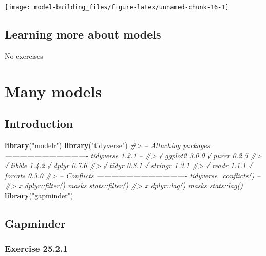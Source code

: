 \documentclass[]{book}
\newenvironment{Shaded}{\begin{snugshade}}{\end{snugshade}}
\newcommand{\CommentTok}[1]{\textcolor[rgb]{0.56,0.35,0.01}{\textit{#1}}}
\newcommand{\KeywordTok}[1]{\textcolor[rgb]{0.13,0.29,0.53}{\textbf{#1}}}
\newcommand{\NormalTok}[1]{#1}
\newcommand{\StringTok}[1]{\textcolor[rgb]{0.31,0.60,0.02}{#1}}
\theoremstyle{plain}
\theoremstyle{remark}
\theoremstyle{definition}
\theoremstyle{definition}
\theoremstyle{definition}
\theoremstyle{remark}
\begin{document}
\begin{center}\texttt{[image: model-building\_files/figure-latex/unnamed-chunk-16-1]} \end{center}

\hypertarget{learning-more-about-models}{%
\section{Learning more about models}\label{learning-more-about-models}}

No exercises

\hypertarget{many-models}{%
\chapter{Many models}\label{many-models}}

\hypertarget{introduction-16}{%
\section{Introduction}\label{introduction-16}}

\begin{Shaded}
\begin{Highlighting}[]
\KeywordTok{library}\NormalTok{(}\StringTok{"modelr"}\NormalTok{)}
\KeywordTok{library}\NormalTok{(}\StringTok{"tidyverse"}\NormalTok{)}
\CommentTok{#> -- Attaching packages ---------------------------------- tidyverse 1.2.1 --}
\CommentTok{#> √ ggplot2 3.0.0     √ purrr   0.2.5}
\CommentTok{#> √ tibble  1.4.2     √ dplyr   0.7.6}
\CommentTok{#> √ tidyr   0.8.1     √ stringr 1.3.1}
\CommentTok{#> √ readr   1.1.1     √ forcats 0.3.0}
\CommentTok{#> -- Conflicts ------------------------------------- tidyverse_conflicts() --}
\CommentTok{#> x dplyr::filter() masks stats::filter()}
\CommentTok{#> x dplyr::lag()    masks stats::lag()}
\KeywordTok{library}\NormalTok{(}\StringTok{"gapminder"}\NormalTok{)}
\end{Highlighting}
\end{Shaded}

\hypertarget{gapminder}{%
\section{Gapminder}\label{gapminder}}

\hypertarget{exercise-25.2.1}{%
\subsection*{\texorpdfstring{Exercise
{25.2.1}}{Exercise 25.2.1}}\label{exercise-25.2.1}}
\end{document}
